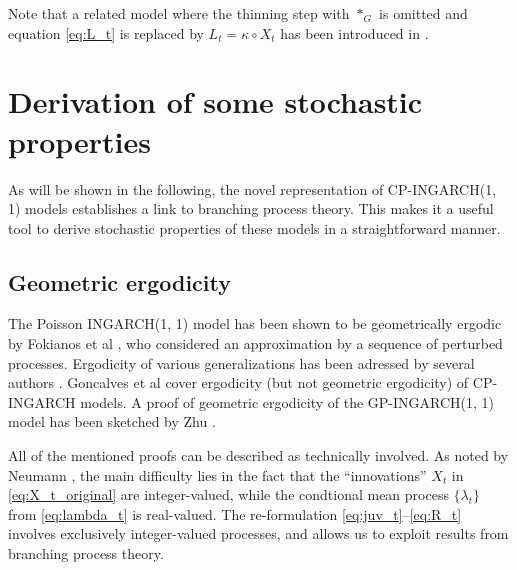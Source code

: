 \documentclass[review]{elsarticle}
\begin{document}
Note that a related model where the thinning step with $*_G$ is omitted and equation \eqref{eq:L_t} is replaced by
$L_t = \kappa \circ X_t$ has been introduced in \cite{Bracher2019}.

\section{Derivation of some stochastic properties}

As will be shown in the following, the novel representation of CP-INGARCH(1, 1) models establishes a link to branching process theory. This makes it a useful tool to derive stochastic properties of these models in a straightforward manner.

\subsection{Geometric ergodicity}

The Poisson INGARCH(1, 1) model has been shown to be geometrically ergodic by Fokianos et al \cite{Fokianos2009}, who considered an approximation by a sequence of perturbed processes. Ergodicity of various generalizations has been adressed by several authors \citep{Davis2016, Douc2013, Neumann2011}. Goncalves et al \citep{Goncalves2015} cover ergodicity (but not geometric ergodicity) of CP-INGARCH models. A proof of geometric ergodicity of the GP-INGARCH(1, 1) model has been sketched by Zhu \citep{Zhu2012}. %

All of the mentioned proofs can be described as technically involved. As noted by Neumann \cite{Neumann2011}, the main difficulty lies in the fact that the ``innovations'' $X_t$ in \eqref{eq:X_t_original} are integer-valued, while the condtional mean process $\{\lambda_t\}$ from \eqref{eq:lambda_t} is real-valued. The re-formulation \eqref{eq:juv_t}--\eqref{eq:R_t} involves exclusively integer-valued processes, and allows us to exploit results from branching process theory.
\end{document}

